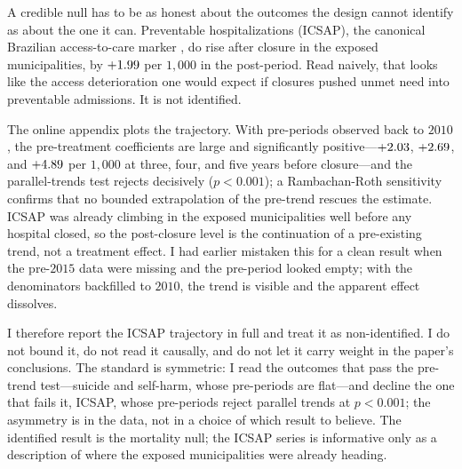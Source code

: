 A credible null has to be as honest about the outcomes the design cannot
identify as about the one it can. Preventable hospitalizations (ICSAP),
the canonical Brazilian access-to-care marker \citep{macinkoHarris2015,
rochaSoares2010}, do rise after closure in the exposed municipalities, by
$+1.99$ per $1{,}000$ in the post-period. Read naively, that looks
like the access deterioration one would expect if closures pushed unmet
need into preventable admissions. It is not identified.

The online appendix plots the trajectory. With pre-periods observed back
to $2010$, the pre-treatment coefficients are large and significantly
positive---$+2.03$, $+2.69$, and
$+4.89$ per $1{,}000$ at three, four, and five years before
closure---and the parallel-trends test rejects decisively ($p < 0.001$);
a Rambachan-Roth sensitivity confirms that no bounded extrapolation of
the pre-trend rescues the estimate. ICSAP was already climbing in the
exposed municipalities well before any hospital closed, so the
post-closure level is the continuation of a pre-existing trend, not a
treatment effect. I had earlier mistaken this for a clean result when the
pre-$2015$ data were missing and the pre-period looked empty; with the
denominators backfilled to $2010$, the trend is visible and the apparent
effect dissolves.

I therefore report the ICSAP trajectory in full and treat it as
non-identified. I do not bound it, do not read it causally, and do not
let it carry weight in the paper's conclusions. The standard is
symmetric: I read the outcomes that pass the pre-trend test---suicide and
self-harm, whose pre-periods are flat---and decline the one that fails it,
ICSAP, whose pre-periods reject parallel trends at $p < 0.001$; the
asymmetry is in the data, not in a choice of which result to believe. The
identified result is the mortality null; the ICSAP series is informative
only as a description of where the exposed municipalities were already
heading.
